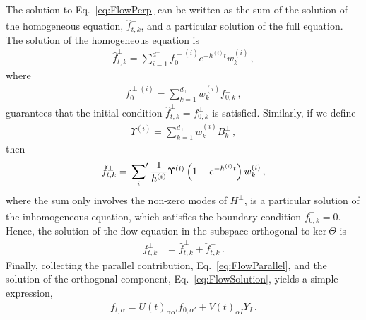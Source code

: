The solution to Eq.~\eqref{eq:FlowPerp} can be written as the sum of the
solution of the homogeneous equation, $\hat{f}^{\perp}_{t,k}$, and a particular
solution of the full equation. The solution of the homogeneous equation is
\begin{align}
    \label{eq:HomoSoln}
    \hat{f}^{\perp}_{t,k} = \sum_{i=1}^{d^\perp} f^{\perp (i)}_{0} e^{-h^{(i)}t} w^{(i)}_k\, ,
\end{align}
where
\begin{align}
    \label{eq:InitialCi}
    f^{\perp (i)}_{0} = \sum_{k=1}^{d_\perp} w^{(i)}_k f^\perp_{0,k}\, ,
\end{align}
guarantees that the initial condition $\hat{f}^\perp_{t,k}=f^\perp_{0,k}$ is
satisfied. Similarly, if we define
\begin{align}
    \label{eq:BiDef}
    \Upsilon^{(i)} = \sum_{k=1}^{d_\perp} w^{(i)}_k B^\perp_{k}\, ,
\end{align}
then
\begin{align}
    \label{eq:PartSol}
    \check{f}^\perp_{t,k} = \sideset{}{'}\sum_{i} \frac{1}{h^{(i)}} \Upsilon^{(i)}
        \left(1 - e^{-h^{(i)}t}\right) w^{(i)}_k\, ,
\end{align}
where the sum only involves the non-zero modes of $H^\perp$, is a particular
solution of the inhomogeneous equation, which satisfies the boundary condition
$\check{f}^{\perp}_{0,k}=0$. Hence, the solution of the flow equation in the
subspace orthogonal to $\text{ker}\ \Theta$ is
\begin{align}
    f^\perp_{t,k}
    \label{eq:FlowSolution}
        &= \hat{f}^\perp_{t,k} + \check{f}^\perp_{t,k}
        \, .
\end{align}
Finally, collecting the parallel contribution, Eq.~\eqref{eq:FlowParallel}, and
the solution of the orthogonal component, Eq.~\eqref{eq:FlowSolution}, yields a
simple expression,
\begin{align}
    \label{eq:AnalyticSol}
    f_{t,\alpha}
        = U(t)_{\alpha\alpha'} f_{0,\alpha'} + V(t)_{\alpha I} Y_{I}\, .
\end{align}
